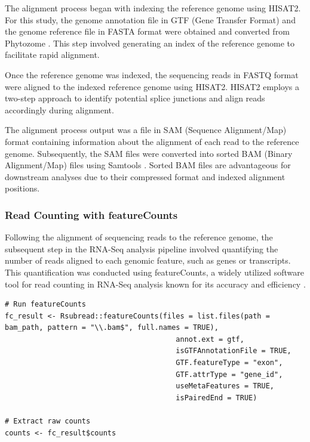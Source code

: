 \documentclass[12pt,letterpaper]{article}
\begin{document}
The alignment process began with indexing the reference genome using HISAT2. For this study, the genome annotation file in GTF (Gene Transfer Format) and the genome reference file in FASTA format were obtained and converted from Phytozome \parencite{goodstein2012phytozome}. This step involved generating an index of the reference genome to facilitate rapid alignment.

Once the reference genome was indexed, the sequencing reads in FASTQ format were aligned to the indexed reference genome using HISAT2. HISAT2 employs a two-step approach to identify potential splice junctions and align reads accordingly during alignment.

The alignment process output was a file in SAM (Sequence Alignment/Map) format containing information about the alignment of each read to the reference genome. Subsequently, the SAM files were converted into sorted BAM (Binary Alignment/Map) files using Samtools \parencite{samtools}. Sorted BAM files are advantageous for downstream analyses due to their compressed format and indexed alignment positions.


\subsubsection{Read Counting with featureCounts}
Following the alignment of sequencing reads to the reference genome, the subsequent step in the RNA-Seq analysis pipeline involved quantifying the number of reads aligned to each genomic feature, such as genes or transcripts. This quantification was conducted using featureCounts, a widely utilized software tool for read counting in RNA-Seq analysis known for its accuracy and efficiency \parencite{liao2014featurecounts}.

\clearpage

\begin{lstlisting}[caption={Example R code for Read Counting with featureCounts.},captionpos=b]
# Run featureCounts
fc_result <- Rsubread::featureCounts(files = list.files(path = bam_path, pattern = "\\.bam$", full.names = TRUE), 
                                        annot.ext = gtf,
                                        isGTFAnnotationFile = TRUE,
                                        GTF.featureType = "exon",
                                        GTF.attrType = "gene_id",
                                        useMetaFeatures = TRUE,
                                        isPairedEnd = TRUE)
  
# Extract raw counts
counts <- fc_result$counts
\end{lstlisting}
\end{document}

